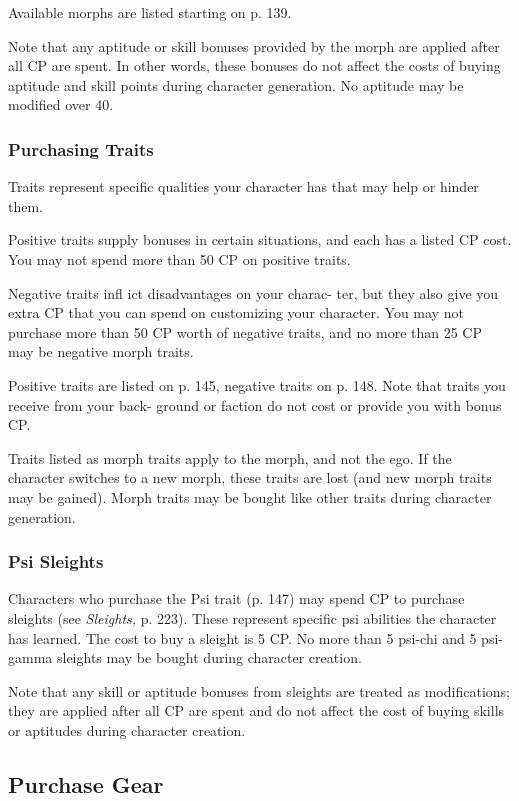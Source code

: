 Available morphs are listed starting on p. 139.

Note that any aptitude or skill bonuses provided by 
the morph are applied after all CP are spent. In other 
words, these bonuses do not affect the costs of buying 
aptitude and skill points during character generation. 
No aptitude may be modified over 40.

\subsubsection{Purchasing Traits}

Traits represent specific qualities your character has 
that may help or hinder them.

Positive traits supply bonuses in certain situations, 
and each has a listed CP cost. You may not spend 
more than 50 CP on positive traits.

Negative traits infl ict disadvantages on your charac-
ter, but they also give you extra CP that you can spend 
on customizing your character. You may not purchase 
more than 50 CP worth of negative traits, and no 
more than 25 CP may be negative morph traits.

Positive traits are listed on p. 145, negative traits on 
p. 148. Note that traits you receive from your back-
ground or faction do not cost or provide you with 
bonus CP.

Traits listed as morph traits apply to the morph, and 
not the ego. If the character switches to a new morph, 
these traits are lost (and new morph traits may be 
gained). Morph traits may be bought like other traits 
during character generation.

\subsubsection{Psi Sleights}

Characters who purchase the Psi trait (p. 147) may 
spend CP to purchase sleights (see \textit{Sleights,} p. 223). 
These represent specific psi abilities the character has 
learned. The cost to buy a sleight is 5 CP. No more 
than 5 psi-chi and 5 psi-gamma sleights may be bought 
during character creation.

Note that any skill or aptitude bonuses from 
sleights are treated as modifications; they are applied 
after all CP are spent and do not affect the cost of 
buying skills or aptitudes during character creation.

\subsection{Purchase Gear}

